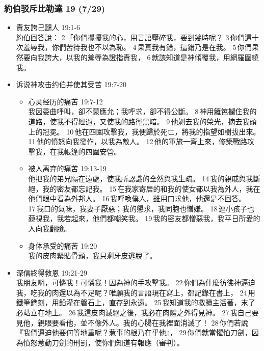 \subsubsection{約伯驳斥比勒達 19 (7/29)}
\begin{itemize}
\itemsep-.45em 
\item 責友誇己譴人 19:1-6\\
約伯回答說： 2 「你們攪擾我的心，用言語壓碎我，要到幾時呢？ 3 你們這十次羞辱我，你們苦待我也不以為恥。 4 果真我有錯，這錯乃是在我。 5 你們果然要向我誇大，以我的羞辱為證指責我， 6 就該知道是神傾覆我，用網羅圍繞我。
\item 诉说神攻击约伯并使其受苦 19:7-20
 \begin{itemize}
\itemsep-.45em 
\item 心灵经历的痛苦 19:7-12\\
我因委曲呼叫，卻不蒙應允；我呼求，卻不得公斷。 8 神用籬笆攔住我的道路，使我不得經過，又使我的路徑黑暗。 9 他剝去我的榮光，摘去我頭上的冠冕。 10 他在四圍攻擊我，我便歸於死亡，將我的指望如樹拔出來。 11 他的憤怒向我發作，以我為敵人。 12 他的軍旅一齊上來，修築戰路攻擊我，在我帳篷的四圍安營。
\item 被人离弃的痛苦 19:13-19 \\
他把我的弟兄隔在遠處，使我所認識的全然與我生疏。 14 我的親戚與我斷絕，我的密友都忘記我。 15 在我家寄居的和我的使女都以我為外人，我在他們眼中看為外邦人。 16 我呼喚僕人，雖用口求他，他還是不回答。 17 我口的氣味，我妻子厭惡；我的懇求，我同胞也憎嫌。 18 連小孩子也藐視我，我若起來，他們都嘲笑我。 19 我的密友都憎惡我，我平日所愛的人向我翻臉。
\item 身体承受的痛苦 19:20\\
我的皮肉緊貼骨頭，我只剩牙皮逃脫了。
\end{itemize}
\item 深信終得救恩 19:21-29 \\
我朋友啊，可憐我！可憐我！因為神的手攻擊我。 22 你們為什麼彷彿神逼迫我，吃我的肉還以為不足呢？唯願我的言語現在寫上，都記錄在書上， 24 用鐵筆鐫刻，用鉛灌在磐石上，直存到永遠。 25 我知道我的救贖主活著，末了必站立在地上。 26 我這皮肉滅絕之後，我必在肉體之外得見神。 27 我自己要見他，親眼要看他，並不像外人。我的心腸在我裡面消滅了！ 28 你們若說『我們逼迫他要何等地重呢？惹事的根乃在乎他』， 29 你們就當懼怕刀劍，因為憤怒惹動刀劍的刑罰，使你們知道有報應（審判）。
\end{itemize}

